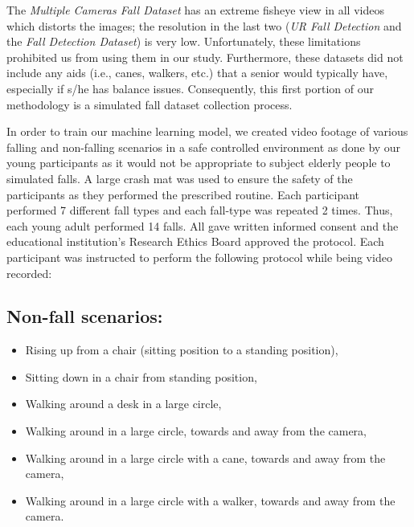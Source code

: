 The \textit{Multiple Cameras Fall Dataset} has an extreme fisheye view in all videos which distorts the images; the resolution in the last two (\textit{UR Fall Detection} and the \textit{Fall Detection Dataset}) is very low. Unfortunately, these limitations prohibited us from using them in our study. Furthermore, these datasets did not include any aids (i.e., canes, walkers, etc.) that a senior would typically have, especially if s/he has balance issues. Consequently, this first portion of our methodology is a simulated fall dataset collection process.


In order to train our machine learning model, we created video footage of various falling and non-falling scenarios in a safe controlled environment as done by our young participants as it would not be appropriate to subject elderly people to simulated falls. A large crash mat was used to ensure the safety of the participants as they performed the prescribed routine. Each participant performed 7 different fall types and each fall-type was repeated 2 times. Thus, each young adult performed 14 falls. All gave written informed consent and the educational institution’s Research Ethics Board approved the protocol. Each participant was instructed to perform the following protocol while being video recorded:


\subsection{Non-fall scenarios:}
 \begin{itemize}
    \item Rising up from a chair (sitting position to a standing position),
    \item Sitting down in a chair from standing position,
    \item Walking around a desk in a large circle,
    \item Walking around in a large circle, towards and away from the camera,
    \item Walking around in a large circle with a cane, towards and away from the camera,
    \item Walking around in a large circle with a walker, towards and away from the camera.
\end{itemize}


